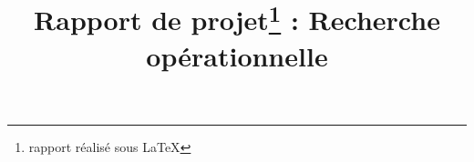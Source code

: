 \documentclass[a4paper,sffamily,12pt]{article}
\title{\vspace{\fill}\LARGE\bfseries\sffamily Rapport de projet\protect\footnote{rapport réalisé sous \LaTeX} : Recherche opérationnelle\vspace{\fill}}
\begin{document}
	\date{} %
	\maketitle %

	\thispagestyle{fancy} %
	
	\newpage
			
	\renewcommand{\contentsname}{Sommaire}
	\tableofcontents
	
	\newpage
				
\end{document}
